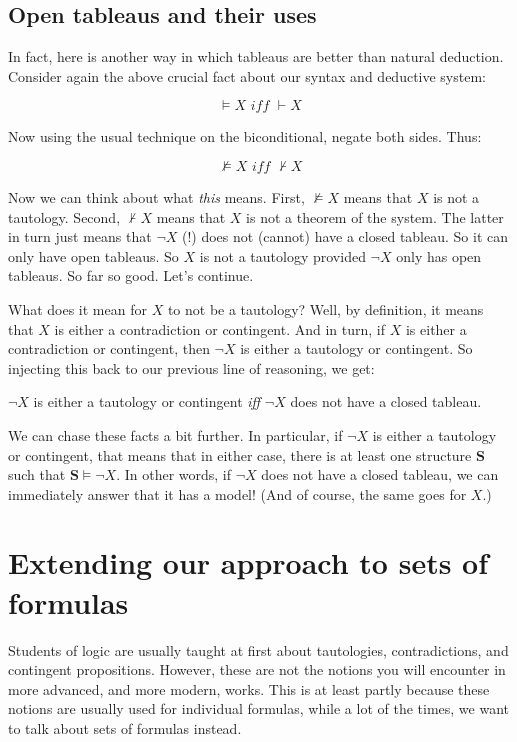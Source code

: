 \subsection{Open tableaus and their uses}

In fact, here is another way in which tableaus are better than natural deduction. Consider again the above crucial fact about our syntax and deductive system:

\[\models X \textit{ iff } \vdash X\]

Now using the usual technique on the biconditional, negate both sides. Thus: 

\[\not\models X \textit{ iff } \nvdash X\]

Now we can think about what \textit{this} means. First, $\not\models X$ means that $X$ is not a tautology. Second, $\nvdash X$ means that $X$ is not a theorem of the system. The latter in turn just means that $\neg X$ (!)  does not (cannot) have a closed tableau. So it can only have open tableaus. So $X$ is not a tautology provided $\neg X$ only has open tableaus. So far so good. Let's continue. 

What does it mean for $X$ to not be a tautology? Well, by definition, it means that $X$ is either a contradiction or contingent. And in turn, if $X$ is either a contradiction or contingent, then $\neg X$ is either a tautology or contingent. So injecting this back to our previous line of reasoning, we get:

\begin{prop}
$\neg X$ is either a tautology or contingent \textit{iff} $\neg X$ does not have a closed tableau. 
\end{prop} 

We can chase these facts a bit further. In particular, if $\neg X$ is either a tautology or contingent, that means that in either case, there is at least one structure $\mathbf{S}$ such that $\mathbf{S} \models \neg X$. In other words, if $\neg X$ does not have a closed tableau, we can immediately answer that it has a model! (And of course, the same goes for $X$.)

\section{Extending our approach to sets of formulas}

Students of logic are usually taught at first about tautologies, contradictions, and contingent propositions. However, these are not the notions you will encounter in more advanced, and more modern, works. This is at least partly because these notions are usually used for individual formulas, while a lot of the times, we want to talk about sets of formulas instead. 

